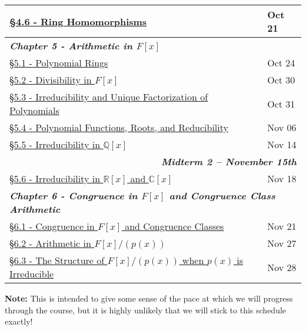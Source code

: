 \documentclass{article}
\newcommand{\chaptercolor}{RoyalBlue!35}
\newcommand{\testcolor}{Bittersweet!25}
\begin{document}
\begin{center}
\begin{tabular}{|l|l|}
\href{}{\S4.6 - Ring Homomorphisms} & Oct 21\\
\hline
\multicolumn{2}{|l|}{\cellcolor{\chaptercolor} \textit{\textbf{Chapter 5 - Arithmetic in $F[x]$}}}\\
\hline
\href{}{\S5.1 - Polynomial Rings} & Oct 24\\
\href{}{\S5.2 - Divisibility in $F[x]$} & Oct 30\\
\href{}{\S5.3 - Irreducibility and Unique Factorization of Polynomials} & Oct 31\\
\href{}{\S5.4 - Polynomial Functions, Roots, and Reducibility} & Nov 06\\
\href{}{\S5.5 - Irreducibility in $\mathbb{Q}[x]$} & Nov 14\\
\hline
\multicolumn{2}{|r|}{\cellcolor{\testcolor} \textit{\textbf{Midterm 2 -- November 15th}}}\\
\hline
\href{}{\S5.6 - Irreducibility in $\mathbb{R}[x]$ and $\mathbb{C}[x]$} & Nov 18\\
\hline
\multicolumn{2}{|l|}{\cellcolor{\chaptercolor} \textit{\textbf{Chapter 6 - Congruence in $F[x]$ and Congruence Class Arithmetic}}}\\
\hline
\href{}{\S6.1 - Congruence in $F[x]$ and Congruence Classes} & Nov 21\\
\href{}{\S6.2 - Arithmetic in $F[x]/(p(x))$} & Nov 27\\
\href{}{\S6.3 - The Structure of $F[x]/(p(x))$ when $p(x)$ is Irreducible} & Nov 28\\
\hline
\end{tabular}
\end{center}
\noindent \textbf{Note:} This is intended to give some sense of the pace at which we will progress through the course, but it is highly unlikely that we will stick to this schedule exactly!
\end{document}
